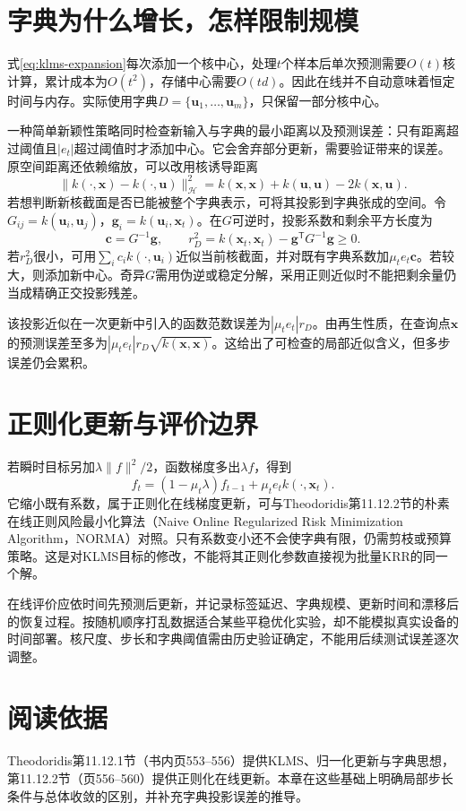 \section{字典为什么增长，怎样限制规模}
式\eqref{eq:klms-expansion}每次添加一个核中心，处理$t$个样本后单次预测需要$O(t)$核计算，累计成本为$O(t^2)$，存储中心需要$O(td)$。因此在线并不自动意味着恒定时间与内存。实际使用字典$D=\{\bm u_1,\ldots,\bm u_m\}$，只保留一部分核中心。

一种简单新颖性策略同时检查新输入与字典的最小距离以及预测误差：只有距离超过阈值且$|e_t|$超过阈值时才添加中心。它会舍弃部分更新，需要验证带来的误差。原空间距离还依赖缩放，可以改用核诱导距离
\begin{equation}
 \|k(\cdot,\bm x)-k(\cdot,\bm u)\|_{\mathcal H}^2
 =k(\bm x,\bm x)+k(\bm u,\bm u)-2k(\bm x,\bm u).
\end{equation}
若想判断新核截面是否已能被整个字典表示，可将其投影到字典张成的空间。令$G_{ij}=k(\bm u_i,\bm u_j)$，$\bm g_i=k(\bm u_i,\bm x_t)$。在$G$可逆时，投影系数和剩余平方长度为
\begin{equation}
 \bm c=G^{-1}\bm g,\qquad
 r_D^2=k(\bm x_t,\bm x_t)-\bm g^{\mathsf T}G^{-1}\bm g\ge0.
 \label{eq:klms-dictionary-residual}
\end{equation}
若$r_D^2$很小，可用$\sum_i c_i k(\cdot,\bm u_i)$近似当前核截面，并对既有字典系数加$\mu_t e_t\bm c$。若较大，则添加新中心。奇异$G$需用伪逆或稳定分解，采用正则近似时不能把剩余量仍当成精确正交投影残差。

该投影近似在一次更新中引入的函数范数误差为$|\mu_te_t|r_D$。由再生性质，在查询点$\bm x$的预测误差至多为$|\mu_te_t|r_D\sqrt{k(\bm x,\bm x)}$。这给出了可检查的局部近似含义，但多步误差仍会累积。

\section{正则化更新与评价边界}
若瞬时目标另加$\lambda\|f\|^2/2$，函数梯度多出$\lambda f$，得到
\begin{equation}
 f_t=(1-\mu_t\lambda)f_{t-1}+\mu_te_tk(\cdot,\bm x_t).
\end{equation}
它缩小既有系数，属于正则化在线梯度更新，可与Theodoridis第11.12.2节的朴素在线正则风险最小化算法（Naive Online Regularized Risk Minimization Algorithm，NORMA）对照。只有系数变小还不会使字典有限，仍需剪枝或预算策略。这是对KLMS目标的修改，不能将其正则化参数直接视为批量KRR的同一个解。

在线评价应依时间先预测后更新，并记录标签延迟、字典规模、更新时间和漂移后的恢复过程。按随机顺序打乱数据适合某些平稳优化实验，却不能模拟真实设备的时间部署。核尺度、步长和字典阈值需由历史验证确定，不能用后续测试误差逐次调整。

\section{阅读依据}
Theodoridis第11.12.1节（书内页553--556）提供KLMS、归一化更新与字典思想，第11.12.2节（页556--560）提供正则化在线更新。本章在这些基础上明确局部步长条件与总体收敛的区别，并补充字典投影误差的推导。
